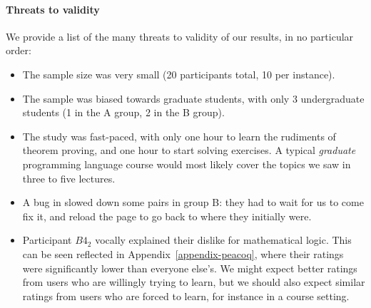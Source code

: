 \paragraph{Threats to validity}

We provide a list of the many threats to validity of our results, in no
particular order:

\begin{itemize}

  \item The sample size was very small (20 participants total, 10 per instance).

  \item The sample was biased towards graduate students, with only 3
undergraduate students (1 in the A group, 2 in the B group).

  \item The study was fast-paced, with only one hour to learn the rudiments of
theorem proving, and one hour to start solving exercises.  A typical
\emph{graduate} programming language course would most likely cover the topics
we saw in three to five lectures.

  \item A bug in \PeaCoq{} slowed down some pairs in group B: they had to wait
for us to come fix it, and reload the page to go back to where they initially
were.

  \item Participant $B4_{2}$ vocally explained their dislike for mathematical
logic.  This can be seen reflected in Appendix~\ref{appendix-peacoq}, where
their ratings were significantly lower than everyone else's.  We might expect better ratings from users who are willingly trying to learn, but we should also expect similar ratings from users who are forced to learn, for instance in a course setting.

\end{itemize}
